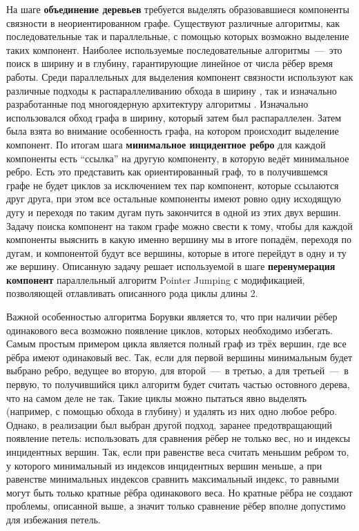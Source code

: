 \documentclass[a4paper,12pt]{extarticle}
\begin{document}
На шаге \textbf{объединение деревьев} требуется выделять образовавшиеся компоненты связности в неориентированном графе.
Существуют различные алгоритмы, как последовательные так и параллельные, с помощью которых возможно выделение таких компонент. 
Наиболее используемые последовательные алгоритмы~---~это поиск в ширину и в глубину, гарантирующие линейное от числа рёбер время работы.
Среди параллельных для выделения компонент связности используют как различные подходы к распараллеливанию обхода в ширину \cite{bfs-parallel}, так и изначально разработанные под многоядерную архитектуру алгоритмы \cite{comp-parallel-a, comp-parallel-b}.
Изначально использовался обход графа в ширину, который затем был распараллелен.
Затем была взята во внимание особенность графа, на котором происходит выделение компонент.
По итогам шага \textbf{минимальное инцидентное ребро} для каждой компоненты есть ``ссылка'' на другую компоненту, в которую ведёт минимальное ребро.
Есть это представить как ориентированный граф, то в получившемся графе не будет циклов за исключением тех пар компонент, которые ссылаются друг друга, при этом все остальные компоненты имеют ровно одну исходящую дугу и переходя по таким дугам путь закончится в одной из этих двух вершин.
Задачу поиска компонент на таком графе можно свести к тому, чтобы для каждой компоненты выяснить в какую именно вершину мы в итоге попадём, переходя по дугам, и компонентой будут все вершины, которые в итоге перейдут в одну и ту же вершину.
Описанную задачу решает используемой в шаге \textbf{перенумерация компонент} параллельный алгоритм Pointer Jumping с модификацией, позволяющей отлавливать описанного рода циклы длины 2.

Важной особенностью алгоритма Борувки является то, что при наличии рёбер одинакового веса возможно появление циклов, которых необходимо избегать.
Самым простым примером цикла является полный граф из трёх вершин, где все рёбра имеют одинаковый вес.
Так, если для первой вершины минимальным будет выбрано ребро, ведущее во вторую, для второй~---~в третью, а для третьей~---~в первую, то получившийся цикл алгоритм будет считать частью остовного дерева, что на самом деле не так.
Такие циклы можно пытаться явно выделять (например, с помощью обхода в глубину) и удалять из них одно любое ребро.
Однако, в реализации был выбран другой подход, заранее предотвращающий появление петель: использовать для сравнения рёбер не только вес, но и индексы инцидентных вершин.
Так, если при равенстве веса считать меньшим ребром то, у которого минимальный из индексов инцидентных вершин меньше, а при равенстве минимальных индексов сравнить максимальный индекс, то равными могут быть только кратные рёбра одинакового веса.
Но кратные рёбра не создают проблемы, описанной выше, а значит только сравнение рёбер вполне допустимо для избежания петель.
\end{document}
